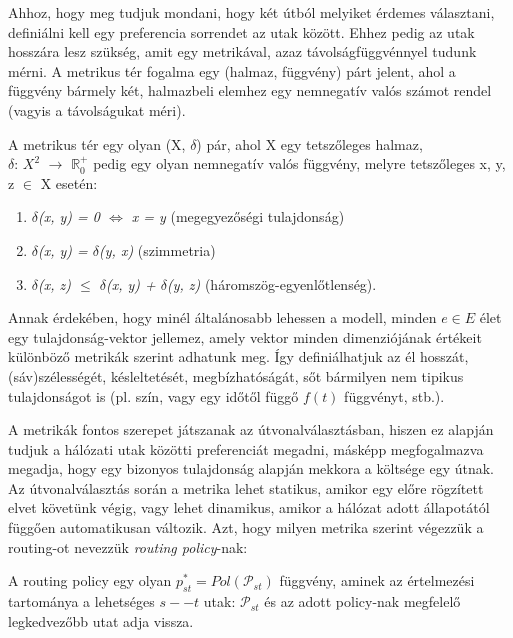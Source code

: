   Ahhoz, hogy meg tudjuk mondani, hogy két útból melyiket érdemes választani, definiálni kell egy preferencia sorrendet az utak között. Ehhez pedig az utak hosszára lesz szükség, amit egy metrikával, azaz távolságfüggvénnyel tudunk mérni. A metrikus tér fogalma egy (halmaz, függvény) párt jelent, ahol a függvény bármely két, halmazbeli elemhez egy nemnegatív valós számot rendel (vagyis a távolságukat méri).

  \begin{definition}\label{eq:MetrikusTerDef}
    A metrikus tér egy olyan (X, $\delta$) pár, ahol X egy tetszőleges halmaz,\\$\delta$: $X^{2}$ $\rightarrow$ $\mathbb{R}^{+}_{0}$ pedig egy olyan nemnegatív valós függvény, melyre tetszőleges x, y, z $\in$ X esetén:
    \begin{enumerate}
    \item \emph{ $\delta$(x, y) = 0 $\Leftrightarrow$ x = y } (megegyezőségi tulajdonság)
    \item \emph{ $\delta$(x, y) = $\delta$(y, x) } (szimmetria)
    \item \emph{ $\delta$(x, z) $\leq$ $\delta$(x, y) + $\delta$(y, z) } (háromszög-egyenlőtlenség).
    \end{enumerate}
  \end{definition}

  Annak érdekében, hogy  minél általánosabb lehessen a modell, minden $e \in E$ élet egy tulajdonság-vektor jellemez, amely vektor minden dimenziójának értékeit különböző metrikák szerint adhatunk meg. Így definiálhatjuk az él hosszát, (sáv)szélességét, késleltetését, megbízhatóságát, sőt bármilyen nem tipikus tulajdonságot is (pl. szín, vagy egy időtől függő $f(t)$ függvényt, stb.).

  A metrikák fontos szerepet játszanak az útvonalválasztásban, hiszen ez alapján tudjuk a hálózati utak közötti preferenciát megadni, másképp megfogalmazva megadja, hogy egy bizonyos tulajdonság alapján mekkora a költsége egy útnak. Az útvonalválasztás során a metrika lehet statikus, amikor egy előre rögzített elvet követünk végig, vagy lehet dinamikus, amikor a hálózat adott állapotától függően automatikusan változik. Azt, hogy milyen metrika szerint végezzük a routing-ot nevezzük \emph{routing policy}-nak:

  \begin{definition} 
    A routing policy egy olyan $p_{st}^{*}=Pol(\mathcal{P}_{st})$ függvény, aminek az értelmezési tartománya a lehetséges $s -- t$ utak: $\mathcal{P}_{st}$ és az adott policy-nak megfelelő legkedvezőbb utat adja vissza.
  \end{definition}

